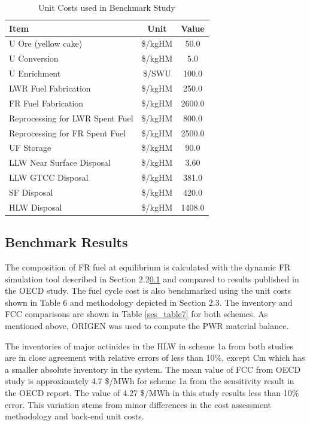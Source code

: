 \begin{table}[htbp]
\begin{center}
\caption{Unit Costs used in Benchmark Study}
\label{ses_table6}
\begin{tabular}{|l|c|c|}
\hline
\textbf{Item}                   & \textbf{Unit} & \textbf{Value} \\
\hline
U Ore (yellow cake)             & \$/kgHM       & 50.0 \\
U Conversion                    & \$/kgHM       & 5.0 \\
U Enrichment                    & \$/SWU        & 100.0 \\
LWR Fuel Fabrication            & \$/kgHM       & 250.0 \\
FR Fuel Fabrication             & \$/kgHM       & 2600.0 \\
Reprocessing for LWR Spent Fuel & \$/kgHM       & 800.0 \\
Reprocessing for FR Spent Fuel  & \$/kgHM       & 2500.0 \\
UF Storage                      & \$/kgHM       & 90.0 \\
LLW Near Surface Disposal       & \$/kgHM       & 3.60 \\
LLW GTCC Disposal               & \$/kgHM       & 381.0 \\
SF Disposal                     & \$/kgHM       & 420.0 \\
HLW Disposal                    & \$/kgHM       & 1408.0 \\
\hline
\end{tabular}
\end{center}
\end{table}



\subsection{Benchmark Results}
\label{ses_sec:benchmark_results}
The composition of FR fuel at equilibrium is calculated with the
dynamic FR simulation tool described in Section 2.2\ref{} and compared to
results published in the OECD study.  The fuel cycle cost is also
benchmarked using the unit costs shown in Table 6 and methodology
depicted in Section 2.3.  The inventory and FCC comparisons are shown in
Table \ref{ses_table7} for both schemes.  As mentioned above, ORIGEN was used to
compute the PWR material balance.

The inventories of major actinides in the HLW in scheme 1a from both
studies are in close agreement with relative errors of less than 10\%,
except Cm which has a smaller absolute inventory in the system. The mean
value of FCC from OECD study is approximately 4.7 \$/MWh for scheme 1a
from the sensitivity result in the OECD report. The value of 4.27 \$/MWh
in this study results less than 10\% error.  This variation stems from
minor differences in the cost assessment methodology and back-end unit
costs. 

